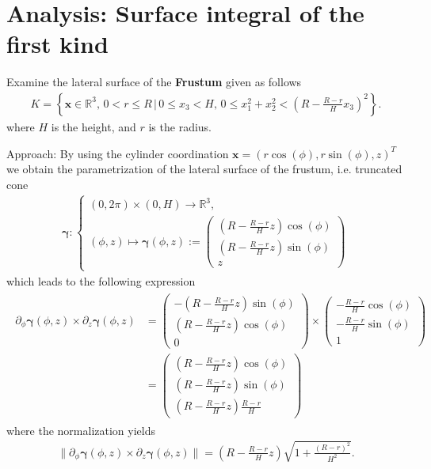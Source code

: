 \documentclass[12pt]{article}
\begin{document}
\section{Analysis: Surface integral of the first kind}
\begin{exampleboxed}
	Examine the lateral surface of the \textbf{Frustum} given as follows
	\begin{align*}
		K =
		\left\{
		\bm{x} \in \mathbb{R}^3,\,
		0 < r \leq R
		\, \Bigg| \,
		0 \leq x_3 < H,\,
		0 \leq x_1^2 + x_2^2 <
		\left(R - \frac{R-r}{H} x_3\right)^2
		\right\}.
	\end{align*}
	where $H$ is the height, and $r$ is the radius.
\end{exampleboxed}
Approach:
By using the cylinder coordination 
$\bm{x} = (r \cos (\phi), r \sin(\phi),z)^T$
we obtain the parametrization of the lateral surface of the frustum,
i.e. truncated cone
\begin{align*}
	\bm{\gamma}: 
	\begin{cases}
		(0,2\pi)\times (0,H) \to \mathbb{R}^3, \\
		(\phi,z) \mapsto \bm{\gamma}(\phi,z) :=
		\begin{pmatrix} \left(R - \frac{R-r}{H}z\right) \cos(\phi) \\
			\left(R - \frac{R-r}{H}z\right) \sin(\phi) \\
			z
		\end{pmatrix}
	\end{cases}
\end{align*}
which leads to the following expression
\begin{align*}
	\boxed{
		\begin{aligned}
			\partial_{\phi} \bm{\gamma}(\phi,z)\times \partial_z \bm{\gamma}(\phi,z)
			 & = \begin{pmatrix} -\left(R - \frac{R-r}{H}z\right) \sin(\phi) \\
				     \left(R - \frac{R-r}{H}z\right) \cos(\phi)  \\
				     0
			     \end{pmatrix}
			\times
			\begin{pmatrix}
				-\frac{R-r}{H}\cos(\phi) \\-\frac{R-r}{H} \sin(\phi)\\1
			\end{pmatrix}             \\
			 & = \begin{pmatrix}
				     \left(R- \frac{R-r}{H}z\right)\cos(\phi) \\
				     \left(R- \frac{R-r}{H}z\right)\sin(\phi) \\
				     \left(R- \frac{R-r}{H}z\right)\frac{R-r}{H}
			     \end{pmatrix}
		\end{aligned}
	}
\end{align*}
where the normalization yields
\begin{align*}
	\boxed{
		\Big\|
		\partial_{\phi} \bm{\gamma} (\phi,z) \times \partial_z \bm{\gamma} (\phi,z)
		\Big\|
		= \left(R - \frac{R-r}{H}z\right) \sqrt{1 + \frac{(R-r)^2}{H^2}}.
	}
\end{align*}
\end{document}

